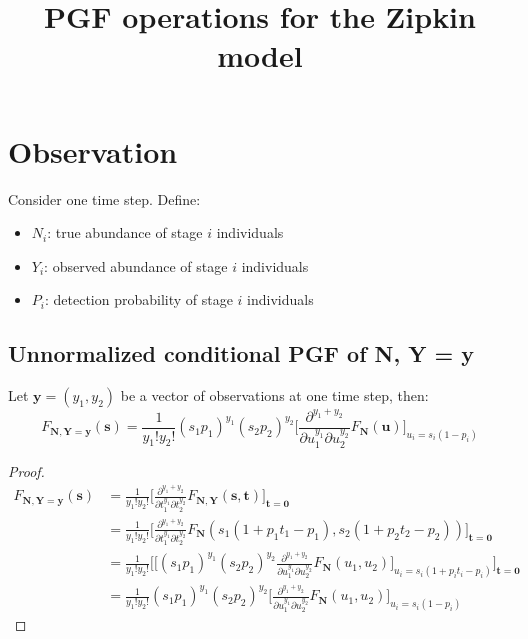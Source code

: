 \documentclass{article}
\title{PGF operations for the Zipkin model}
\begin{document}
\maketitle

\section{Observation}
Consider one time step. Define:
\begin{itemize}
\item $N_i$: true abundance of stage $i$ individuals
\item $Y_i$: observed abundance of stage $i$ individuals
\item $P_i$: detection probability of stage $i$ individuals
\end{itemize}

\subsection{Unnormalized conditional PGF of N, Y = y}
Let $\mathbf{y} = (y_1, y_2)$ be a vector of observations at one time step, then:
$$F_{\mathbf{N}, \mathbf{Y} = \mathbf{y}}(\mathbf{s}) = \frac{1}{y_1!y_2!} (s_1p_1)^{y_1} (s_2p_2)^{y_2} \bigg [\frac{\partial^{y_1+y_2}}{\partial u_1^{y_1} \partial u_2^{y_2}} F_{\mathbf{N}}(\mathbf{u}) \bigg]_{u_i = s_i(1-p_i)}$$

\begin{proof}
\begin{align*}
F_{\mathbf{N}, \mathbf{Y} = \mathbf{y}}(\mathbf{s})
&= \frac{1}{y_1!y_2!} \bigg[\frac{\partial^{y_1+y_2}}{\partial t_1^{y_1} \partial t_2^{y_2}} F_{\mathbf{N}, \mathbf{Y}}(\mathbf{s}, \mathbf{t}) \bigg]_{\mathbf{t} = \mathbf{0}} \\
&= \frac{1}{y_1!y_2!} \bigg[\frac{\partial^{y_1+y_2}}{\partial t_1^{y_1} \partial t_2^{y_2}} F_{\mathbf{N}}(s_1(1+p_1t_1-p_1), s_2(1+p_2t_2-p_2)) \bigg]_{\mathbf{t} = \mathbf{0}} \\
&= \frac{1}{y_1!y_2!} \bigg[ \bigg[ (s_1p_1)^{y_1} (s_2p_2)^{y_2} \frac{\partial^{y_1+y_2}}{\partial u_1^{y_1} \partial u_2^{y_2}} F_{\mathbf{N}}(u_1, u_2) \bigg]_{u_i = s_i(1+p_it_i-p_i)} \bigg]_{\mathbf{t} = \mathbf{0}} \\
&= \frac{1}{y_1!y_2!} (s_1p_1)^{y_1} (s_2p_2)^{y_2} \bigg[ \frac{\partial^{y_1+y_2}}{\partial u_1^{y_1} \partial u_2^{y_2}} F_{\mathbf{N}}(u_1, u_2) \bigg]_{u_i = s_i(1-p_i)}
\end{align*}
\end{proof}
\end{document}
